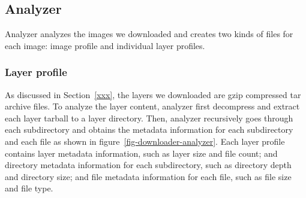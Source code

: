 

%
%

\subsection{Analyzer}

Analyzer analyzes the images we downloaded and creates two kinds of files for each image: image profile and individual layer profiles.
%
%
\subsubsection{Layer profile}

As discussed in Section~\ref{xxx}, the layers we downloaded are gzip compressed tar archive files.
%
To analyze the layer content, analyzer first decompress and extract each layer tarball to a layer directory.
%
Then, analyzer recursively goes through each subdirectory and obtains the metadata information for each subdirectory and each file as shown in figure~\ref{fig-downloader-analyzer}. Each layer profile contains layer metadata information, such as layer size and file count; and directory metadata information for each subdirectory, such as directory depth and directory size; and file metadata information for each file, such as file size and file type.
%

